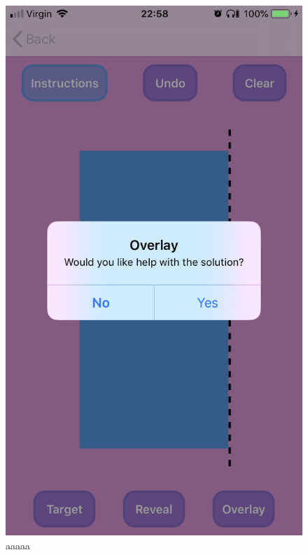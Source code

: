 \documentclass[11pt]{article}
\begin{document}
            \begin{figure}[!ht]
                        \begin{minipage}{0.45\textwidth}
                            \centering \includegraphics[width=0.7\linewidth]{KiriZen/overlayPopUp.png}
                            \caption{aaaaa}
                            \label{fig:kiriZen-overlayPopUp}
                        \end{minipage}\hfill
                        \begin{minipage}{0.45\textwidth}
                            \centering

\end{minipage}
\end{figure}
\end{document}
